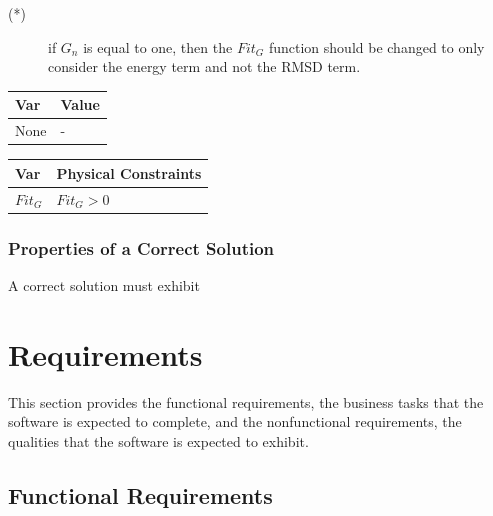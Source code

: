 \documentclass[12pt]{article}
\begin{document}
\noindent 
\begin{description}
\item[(*)] if $G_n$ is equal to one, then the $Fit_G$ function should be 
changed to only consider the energy term and not the RMSD term. 
\end{description}

\begin{table}[!h]
\caption{Specification Parameter Values} \label{TblSpecParams}
\renewcommand{\arraystretch}{1.2}
\noindent \begin{longtable*}{l l} 
  \toprule
  \textbf{Var} & \textbf{Value} \\
  \midrule 
  None & - \\
  \bottomrule
\end{longtable*}
\end{table}

\begin{table}[!h]
\caption{Output Variables} \label{TblOutputVar}
\renewcommand{\arraystretch}{1.2}
\noindent \begin{longtable*}{l l} 
  \toprule
  \textbf{Var} & \textbf{Physical Constraints} \\
  \midrule 
  $Fit_G$ & $Fit_G > 0$
  \\
  \bottomrule
\end{longtable*}
\end{table}

\subsubsection{Properties of a Correct Solution} \label{sec_CorrectSolution}

\noindent
A correct solution must exhibit 

\section{Requirements}

This section provides the functional requirements, the business tasks that the
software is expected to complete, and the nonfunctional requirements, the
qualities that the software is expected to exhibit.

\subsection{Functional Requirements}
\end{document}
